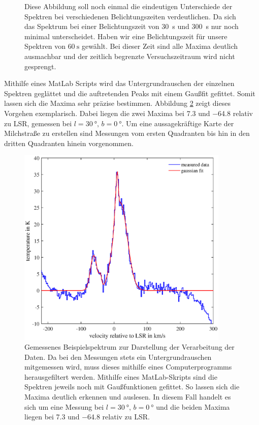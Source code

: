 \begin{figure}[H]
    \centering
       
    \caption[Eindeutigen Unterschiede der Spektren bei verschiedenen Belichtungszeiten]{Diese Abbildung soll noch einmal die eindeutigen Unterschiede der Spektren bei verschiedenen Belichtungszeiten verdeutlichen. Da sich das Spektrum bei einer Belichtungszeit von \SI{30}{\second} und \SI{300}{\second} nur noch minimal unterscheidet. Haben wir eine Belichtungszeit für unsere Spektren von $\SI{60}{\second}$ gewählt. Bei dieser Zeit sind alle Maxima deutlich ausmachbar und der zeitlich begrenzte Versuchszeitraum wird nicht gesprengt.}
    \label{fig:BelichtungszeitExtremal}
\end{figure}
Mithilfe eines MatLab Scripts wird das Untergrundrauschen der einzelnen Spektren geglättet und die auftretenden Peaks mit einem Gaußfit gefittet. Somit lassen sich die Maxima sehr präzise bestimmen. Abbildung \ref{fig:TestBaseline} zeigt dieses Vorgehen exemplarisch. Dabei liegen die zwei Maxima bei \SI{7.3}{} und \SI{-64.8}{} relativ zu LSR, gemessen bei $l = \SI{30}{\degree}, \, b = \SI{0}{\degree}$. Um eine aussagekräftige Karte der Milchstraße zu erstellen sind Messungen vom ersten Quadranten bis hin in den dritten Quadranten hinein vorgenommen.
\begin{figure}[H]
    \centering
    \includegraphics[width= 0.9\textwidth]{plots/TestBaseline.eps}
    \caption[Gemessenes Beispielspektrum zur Darstellung der Verarbeitung der Daten]{Gemessenes Beispielspektrum zur Darstellung der Verarbeitung der Daten. Da bei den Messungen stets ein Untergrundrauschen mitgemessen wird, muss dieses mithilfe eines Computerprogramms herausgefiltert werden. Mithilfe eines MatLab-Skripts sind die Spektren jeweils noch mit Gaußfunktionen gefittet. So lassen sich die Maxima deutlich erkennen und auslesen. In diesem Fall handelt es sich um eine Messung bei $l = \SI{30}{\degree}, \, b = \SI{0}{\degree}$ und die beiden Maxima liegen bei \SI{7.3}{} und \SI{-64.8}{} relativ zu LSR.}
    \label{fig:TestBaseline}
\end{figure}
